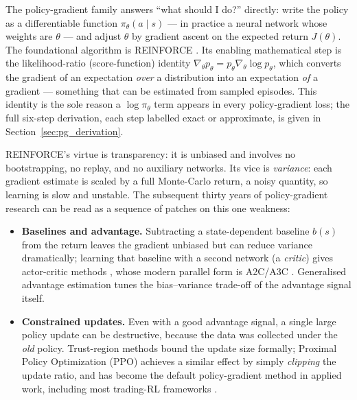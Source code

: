 The policy-gradient family answers ``what should I do?'' directly: write
the policy as a differentiable function $\pi_\theta(a \mid s)$ --- in
practice a neural network whose weights are $\theta$ --- and adjust
$\theta$ by gradient ascent on the expected return $J(\theta)$. The
foundational algorithm is REINFORCE \cite{williams1992}. Its enabling
mathematical step is the likelihood-ratio (score-function) identity
$\nabla_\theta p_\theta = p_\theta \nabla_\theta \log p_\theta$, which
converts the gradient of an expectation \emph{over} a distribution into
an expectation \emph{of} a gradient --- something that can be estimated
from sampled episodes. This identity is the sole reason a
$\log \pi_\theta$ term appears in every policy-gradient loss; the full
six-step derivation, each step labelled exact or approximate, is given in
Section~\ref{sec:pg_derivation}.

REINFORCE's virtue is transparency: it is unbiased and involves no
bootstrapping, no replay, and no auxiliary networks. Its vice is
\emph{variance}: each gradient estimate is scaled by a full Monte-Carlo
return, a noisy quantity, so learning is slow and unstable. The
subsequent thirty years of policy-gradient research can be read as a
sequence of patches on this one weakness:

\begin{itemize}
  \item \textbf{Baselines and advantage.} Subtracting a state-dependent
        baseline $b(s)$ from the return leaves the gradient unbiased but
        can reduce variance dramatically; learning that baseline with a
        second network (a \emph{critic}) gives actor-critic methods
        \cite{konda2000}, whose modern parallel form is A2C/A3C
        \cite{mnih2016}. Generalised advantage estimation
        \cite{schulman2016gae} tunes the bias--variance trade-off of the
        advantage signal itself.
  \item \textbf{Constrained updates.} Even with a good advantage signal,
        a single large policy update can be destructive, because the data
        was collected under the \emph{old} policy. Trust-region methods
        \cite{schulman2015trpo} bound the update size formally; Proximal
        Policy Optimization (PPO) \cite{schulman2017ppo} achieves a
        similar effect by simply \emph{clipping} the update ratio, and
        has become the default policy-gradient method in applied work,
        including most trading-RL frameworks \cite{liu2020finrl}.
\end{itemize}

